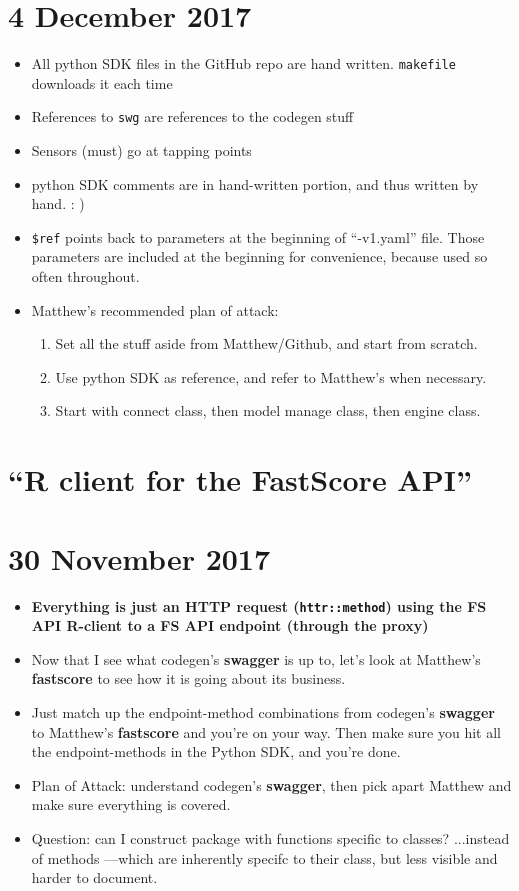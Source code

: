 \documentclass{article}
\begin{document}
\section*{4 December 2017}
\begin{itemize}
\item All python SDK files in the GitHub repo are hand written. \verb|makefile| downloads it each time
\item References to \verb|swg| are references to the codegen stuff
\item Sensors (must) go at tapping points
\item python SDK comments are in hand-written portion, and thus written by hand. : )
\item \verb|$ref| points back to parameters at the beginning of ``-v1.yaml'' file. Those parameters are included at the beginning for convenience, because used so often throughout.
\item Matthew's recommended plan of attack: 
  \begin{enumerate}
  \item Set all the stuff aside from Matthew/Github, and start from scratch. 
  \item Use python SDK as reference, and refer to Matthew's when necessary. 
  \item Start with connect class, then model manage class, then engine class.
  \end{enumerate}
\end{itemize}

\section*{``R client for the FastScore API''}

\section*{30 November 2017}
\begin{itemize}
\item {\bf Everything is just an HTTP request (\verb|httr::method|) using the FS API R-client to a FS API endpoint (through the proxy)}
\item Now that I see what codegen's {\bf swagger} is up to, let's look at Matthew's {\bf fastscore} to see how it is going about its business.
\item Just match up the endpoint-method combinations from codegen's {\bf swagger} to Matthew's {\bf fastscore} and you're on your way. Then make sure you hit all the endpoint-methods in the Python SDK, and you're done.
\item Plan of Attack: understand codegen's {\bf swagger}, then pick apart Matthew and make sure everything is covered.
\item Question: can I construct package with functions specific to classes? ...instead of methods ---which are inherently specifc to their class, but less visible and harder to document.
\end{itemize}
\end{document}
